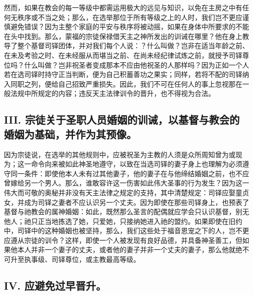 然而，如果在教会的每一等级中都需运用极大的远见与知识，以免在主房之中有任何无秩序或不当之处；那么，在选举那位于所有等级之上的人时，我们岂不更应谨慎避免错误？因为主整个家庭的平安与秩序将被动摇，如果在身体中所要求的不能在头中找到。那么，蒙福的宗徒保禄借天主之神所发出的训诫在哪里？他在身上教导了整个基督司铎团体，并对我们每个人说：？什么叫做？岂非在适当年龄之前、在未及考验之时、在未经服从而堪当之前、在尚未经纪律试炼之前，就授予司铎尊位吗？什么叫做？岂非祝圣者变成那本不应由他祝圣的人那样吗？因为正如一个人若在选司铎时持守正当判断，便为自己积蓄善功之果实；同样，若将不配的司铎纳入同职之列，便给自己招致严重损失。因此，我们不可在任何人的事上忽视那在一般法规中所规定的内容；违反天主法律训令的晋升，也不得视为合法。\par


\subsection{III. 宗徒关于圣职人员婚姻的训诫，以基督与教会的婚姻为基础，并作为其预像。}

因为宗徒说，在选举的其他规则中，应被祝圣为主教的人须是众所周知曾为或现为；这一命令向来被如此神圣地遵守，以致在当选司铎的妻子身上也理解为必须遵守同一条件：即使他本人未有过其他妻子，他的妻子在与他缔结婚姻之前，也不应曾嫁给另一个男人。那么，谁敢容许这一伤害如此伟大圣事的行为发生？因为这一伟大而可敬的奥秘并非没有天主法律之规定的支持，其中清楚规定：司铎应娶童贞女，并成为司铎之妻者不应认识另一个丈夫。因为即使在那些司铎身上，也预表了基督与祂教会的属神婚姻：如此，既然那么圣言的配偶就应学会只认识基督，别无他人；祂只正当地拣选了她，只爱她，只接纳她进入祂的盟约。如果即使在旧约中，司铎中的这种婚姻也被坚持，那么，我们这些处于福音恩宠之下的人，岂不更应遵从宗徒的训令？这样，即使一个人被发现有良好品德，并具备神圣善工，但如果他本人并非一个妻子的丈夫，或者他的妻子并非一个丈夫的妻子，那么他就绝不可升至执事级、司铎尊位，或主教最高等级。\par


\subsection{IV. 应避免过早晋升。}

